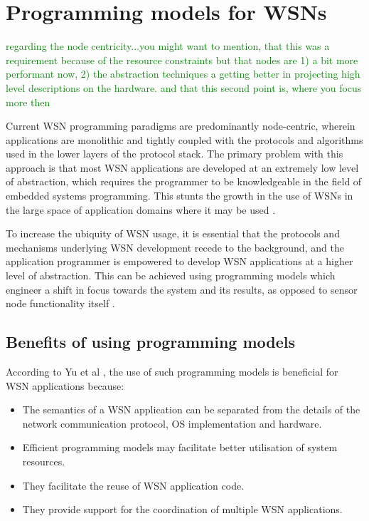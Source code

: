 \section {Programming models for WSNs}

\textcolor{green}{regarding the node centricity...you might want to mention, that this was a requirement because of the resource constraints  but that nodes  are 1) a bit more performant now, 2) the abstraction techniques a getting better in projecting high level descriptions on the hardware. and that this second point is, where you focus more then }

Current WSN programming paradigms are predominantly node-centric, wherein
applications are monolithic and tightly coupled with the protocols and algorithms
used in the lower layers of the protocol stack. The primary problem with this
approach is that most WSN applications are developed at an extremely low level of
abstraction, which requires the programmer to be knowledgeable in the field of
embedded systems programming. This stunts the growth in the use of WSNs in the
large space of application domains where it may be used
\cite{mottola_middleware:2008}.

 To increase the ubiquity of WSN
usage, it is essential that the protocols and mechanisms underlying WSN
development recede to the background, and the application programmer is
empowered to develop WSN applications at a higher level of abstraction. This
can be achieved using programming models which engineer a shift in focus
towards the system and its results, as opposed to sensor node functionality
itself \cite{mottola_middleware:2008}. 

\subsection{Benefits of using programming models}

According to Yu et al \cite{yu_issuesMiddleware:2004}, the use of such
programming models is beneficial for WSN applications because:
\begin{itemize}
\item The semantics of a WSN application can be separated from the details of 
the network communication protocol, OS implementation and hardware.
\item Efficient programming models may facilitate better utilisation of system 
resources.
\item They facilitate the reuse of WSN application code.
\item They provide support for the coordination of multiple WSN applications.
\end{itemize}

